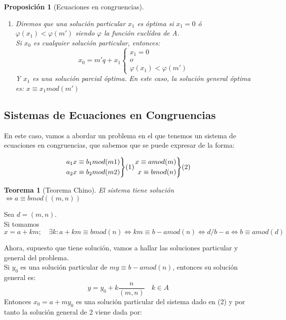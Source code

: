 \documentclass[11pt, a4paper, titlepage]{article}
\makeatletter
\renewenvironment{proof}[1][\proofname] {\vspace{-15pt}\par\pushQED{\qed}\normalfont\topsep6\p@\@plus6\p@\relax\trivlist\item[\hskip\labelsep\it#1\@addpunct{.}]\ignorespaces}{\popQED\endtrivlist\@endpefalse}
\theoremstyle{theorem-style}
\newtheorem*{nth}{Teorema}
\newtheorem*{nprop}{Proposición}
\theoremstyle{definition-style}
\theoremstyle{remark-style}
\theoremstyle{example-style}
\newenvironment{rcases}
  {\left.\begin{aligned}}
  {\end{aligned}\right\rbrace}
\makeatother
\begin{document}
\begin{nprop}[Ecuaciones en congruencias]
\begin{itemize}
\begin{enumerate}
\item Diremos que una solución particular $x_1$ es óptima si $x_1 = 0$ ó $\varphi(x_1) < \varphi(m')$ siendo $\varphi$ la función euclídea de A.\\
Si $x_0$ es cualquier solución particular, entonces:
\[
x_0 = m'q + x_1 \begin{cases}
	x_1 = 0\\
	o\\
	\varphi(x_1) < \varphi(m')
	
\end{cases}
\]
Y $x_1$ es una solución parcial óptima. En este caso, la solución general óptima es: $x\equiv x_1 mod(m')$
\end{enumerate}
\end{itemize}
	
\end{nprop}

\subsection{Sistemas de Ecuaciones en Congruencias}

En este caso, vamos a abordar un problema en el que tenemos un sistema de ecuaciones en congruencias, que sabemos que se puede expresar de la forma:

\[
\begin{rcases}
	a_1x \equiv b_1 mod(m1)\\
	a_2x \equiv b_2 mod(m2)
\end{rcases}(1) \begin{rcases}
	x \equiv a mod(m)\\
	x \equiv b mod(n)
\end{rcases}(2)
\]

\begin{nth}[Teorema Chino]
	El sistema tiene solución $\iff a \equiv b mod((m,n))$
\end{nth}
\begin{proof}
	Sea $d=(m,n)$. \\
	Si tomamos $x = a+km; \quad \exists k: a+km \equiv b mod(n) \iff km \equiv b-a mod(n) \iff d/b-a \iff b\equiv amod(d)$
\end{proof}

Ahora, supuesto que tiene solución, vamos a hallar las soluciones particular y general del problema.\\
Si $y_0$ es una solución particular de $my \equiv b-a mod(n)$, entonces su solución general es: $$y = y_0 + k\frac{n}{(m,n)} \quad k \in A$$
Entonces $x_0 = a + my_0$ es una solución particular del sistema dado en (2) y por tanto la solución general de 2 viene dada por:
\end{document}

